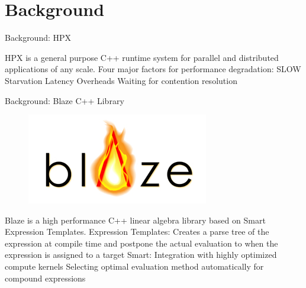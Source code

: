 \documentclass[10pt]{beamer}
\begin{document}
\section{Background}
\begin{frame}{Background: HPX}
	\begin{outline}
		\1HPX is a general purpose C++ runtime system for parallel and distributed applications of any scale.
		\1Four major factors for performance degradation: SLOW
		\2Starvation
		\2Latency
		\2Overheads
		\2Waiting for contention resolution
	\end{outline}
\end{frame}



\begin{frame}{Background: Blaze C++ Library}
\begin{outline}
\begin{figure}[H]

	\includegraphics[width=0.22\linewidth]{images/blaze.png}
\end{figure}	
Blaze is a high performance C++ linear algebra library based on Smart Expression Templates.
 \1Expression Templates:
	\2Creates a parse tree of the expression at compile time and postpone the actual evaluation to when the expression is assigned to a target
\1Smart: 
	\2Integration with highly optimized compute kernels
	\2Selecting optimal evaluation method automatically for compound expressions
\end{outline}
\end{frame}
\end{document}
